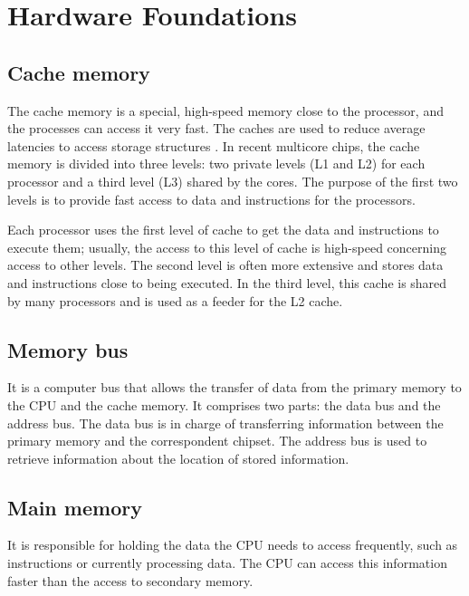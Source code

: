 \section{\label{sec:hardware-foundations}Hardware Foundations}

\subsection{Cache memory}
\label{sec:org49cf4b1}

The cache memory is a special, high-speed memory close to
the processor, and the processes can access it very fast. The caches are used
to reduce average latencies to access storage structures
\cite{DBLP_series_synthesis_2020Nagarajan}. In recent multicore chips, the
cache memory is divided into three levels: two private levels (L1 and L2) for
each processor and a third level (L3) shared by the cores. The
purpose of the first two levels is to provide fast access to data and
instructions for the processors.

Each processor uses the first level of cache to get the data and instructions
to execute them; usually, the access to this level of cache is high-speed
concerning access to other levels. The second level is often more
extensive and stores data and instructions close to being executed. In the third level, this cache is shared by many
processors and is used as a feeder for the L2 cache.

\subsection{Memory bus}
\label{sec:orgda21942}

It is a computer bus that allows the transfer of data from the primary memory to the
CPU and the cache memory. It comprises two parts: the data bus and the
address bus. The data bus is in charge of transferring information between the
primary memory and the correspondent chipset.
The address bus is used to retrieve information about the location of stored
information.


\subsection{Main memory}
\label{sec:orgf1a7f27}

It is responsible for holding the data the CPU needs to access frequently, such
as instructions or currently processing data. The CPU can access 
this information faster than the access to secondary memory.

